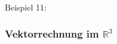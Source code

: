 \documentclass[a4paper]{scrartcl}
\begin{document}
Beispiel 11:

\subsubsection{Vektorrechnung im $\mathbb{R}^3$}
\end{document}
